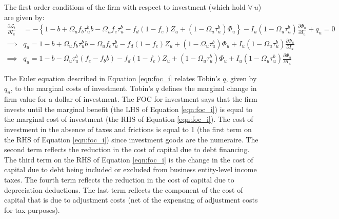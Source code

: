 The first order conditions of the firm with respect to investment (which hold $\forall \ u$) are given by:
 \begin{equation}
\label{eqn:foc_i}
\begin{split}
\frac{\partial \mathcal{L}_{t}}{\partial I_{u}} & = -\left\{1-b+\Omega_{u}f_{b}\tau^{b}_{u}b-\Omega_{u}f_{e}\tau^{b}_{u} - f_{d}(1-f_{e})Z_{u} + (1-\Omega_{u}\tau^{b}_{u})\Phi_{u}\right\} - I_{u}(1-\Omega_{u}\tau^{b}_{u})\frac{\partial \Phi_{u}}{\partial I_{u}} + q_{u} = 0 \\
\implies & q_{u}  = 1-b+\Omega_{u}f_{b}\tau^{b}_{u}b-\Omega_{u}f_{e}\tau^{b}_{u} - f_{d}(1-f_{e})Z_{u} + (1-\Omega_{u}\tau^{b}_{u})\Phi_{u} +  I_{u}(1-\Omega_{u}\tau^{b}_{u})\frac{\partial \Phi_{u}}{\partial I_{u}} \\
\implies & q_{u}  = 1-b-\Omega_{u}\tau^{b}_{u}(f_{e}-f_{b}b) - f_{d}(1-f_{e})Z_{u} + (1-\Omega_{u}\tau^{b}_{u})\Phi_{u} +  I_{u}(1-\Omega_{u}\tau^{b}_{u})\frac{\partial \Phi_{u}}{\partial I_{u}} 
\end{split}
\end{equation}

\noindent\noindent The Euler equation described in Equation \ref{eqn:foc_i} relates Tobin's $q$, given by $q_{u}$, to the marginal costs of investment.  Tobin's $q$ defines the marginal change in firm value for a dollar of investment. The FOC for investment says that the firm invests until the marginal benefit (the LHS of Equation \ref{eqn:foc_i}) is equal to the marginal cost of investment (the RHS of Equation \ref{eqn:foc_i}).  The cost of investment in the absence of taxes and frictions is equal to 1 (the first term on the RHS of Equation \ref{eqn:foc_i}) since investment goods are the numeraire.  The second term reflects the reduction in the cost of capital due to debt financing.  The third term on the RHS of Equation \ref{eqn:foc_i} is the change in the cost of capital due to debt being included or excluded from business entity-level income taxes.  The fourth term reflects the reduction in the cost of capital due to depreciation deductions.  The last term reflects the component of the cost of capital that is due to adjustment costs (net of the expensing of adjustment costs for tax purposes).



